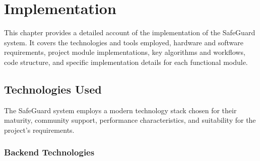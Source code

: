 \chapter{Implementation}

This chapter provides a detailed account of the implementation of the SafeGuard system. It covers the technologies and tools employed, hardware and software requirements, project module implementations, key algorithms and workflows, code structure, and specific implementation details for each functional module.

\section{Technologies Used}

The SafeGuard system employs a modern technology stack chosen for their maturity, community support, performance characteristics, and suitability for the project's requirements.

\subsection{Backend Technologies}

